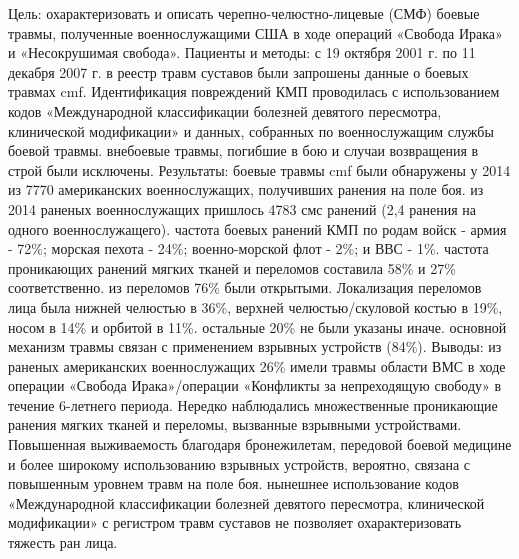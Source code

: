 Цель: охарактеризовать и описать черепно-челюстно-лицевые (СМФ) боевые травмы,
полученные военнослужащими США в ходе операций «Свобода Ирака» и «Несокрушимая
свобода». Пациенты и методы: с 19 октября 2001 г. по 11 декабря 2007 г. в реестр
травм суставов были запрошены данные о боевых травмах cmf. Идентификация
повреждений КМП проводилась с использованием кодов «Международной классификации
болезней девятого пересмотра, клинической модификации» и данных, собранных по
военнослужащим службы боевой травмы. внебоевые травмы, погибшие в бою и случаи
возвращения в строй были исключены. Результаты: боевые травмы cmf были
обнаружены у 2014 из 7770 американских военнослужащих, получивших ранения на
поле боя. из 2014 раненых военнослужащих пришлось 4783 смс ранений (2,4 ранения
на одного военнослужащего). частота боевых ранений КМП по родам войск - армия -
72\%; морская пехота - 24\%; военно-морской флот - 2\%; и ВВС - 1\%. частота
проникающих ранений мягких тканей и переломов составила 58\% и 27\%
соответственно. из переломов 76\% были открытыми. Локализация переломов лица была
нижней челюстью в 36\%, верхней челюстью/скуловой костью в 19\%, носом в 14\% и
орбитой в 11\%. остальные 20\% не были указаны иначе. основной механизм травмы
связан с применением взрывных устройств (84\%). Выводы: из раненых американских
военнослужащих 26\% имели травмы области ВМС в ходе операции «Свобода
Ирака»/операции «Конфликты за непреходящую свободу» в течение 6-летнего периода.
Нередко наблюдались множественные проникающие ранения мягких тканей и переломы,
вызванные взрывными устройствами. Повышенная выживаемость благодаря
бронежилетам, передовой боевой медицине и более широкому использованию взрывных
устройств, вероятно, связана с повышенным уровнем травм на поле боя.  нынешнее
использование кодов «Международной классификации болезней девятого пересмотра,
клинической модификации» с регистром травм суставов не позволяет
охарактеризовать тяжесть ран лица.\cite{20006147}

